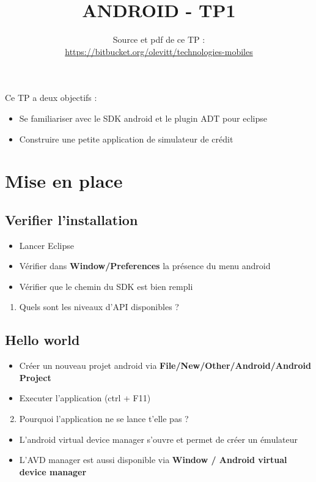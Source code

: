 \documentclass{article}
\title{ANDROID - TP1}
\date{Source et pdf de ce TP
:\\ \href{https://bitbucket.org/olevitt/technologies-mobiles}{https://bitbucket.org/olevitt/technologies-mobiles}}
\begin{document}
\maketitle
Ce TP a deux objectifs :
\begin{itemize}
\item Se familiariser avec le SDK android et le plugin ADT pour eclipse
\item Construire une petite application de simulateur de crédit
\end{itemize}
\section{Mise en place}
\subsection{Verifier l'installation}
\begin{itemize}
\item Lancer Eclipse
\item Vérifier dans \textbf{Window/Preferences} la présence du menu android
\item Vérifier que le chemin du SDK est bien rempli
\end{itemize}
\begin{enumerate}
\item Quels sont les niveaux d'API disponibles ?
\end{enumerate}
\subsection{Hello world}
\begin{itemize}
\item Créer un nouveau projet android via \textbf{File/New/Other/Android/Android
Project}
\item Executer l'application (ctrl + F11)
\end{itemize}
\begin{enumerate}
 \setcounter{enumi}{1}
\item Pourquoi l'application ne se lance t'elle pas ?
\end{enumerate}
\begin{itemize}
\item L'android virtual device manager s'ouvre et permet de créer un
émulateur
\item L'AVD manager est aussi disponible via \textbf{Window / Android virtual
device manager}
\end{itemize}
\end{document}
